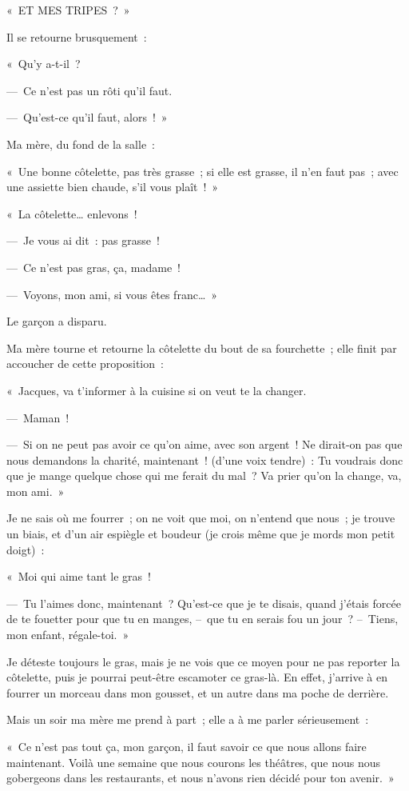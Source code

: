 \documentclass[french,twoside]{book} %
\begin{document}
« ET MES TRIPES ? »\par
Il se retourne brusquement :\par
« Qu’y a-t-il ?\par
— Ce n’est pas un rôti qu’il faut.\par
— Qu’est-ce qu’il faut, alors ! »\par
Ma mère, du fond de la salle :\par
« Une bonne côtelette, pas très grasse ; si elle est grasse, il n’en faut pas ; avec une assiette bien chaude, s’il vous plaît ! »\par
\bigbreak
\noindent « La côtelette… enlevons !\par
— Je vous ai dit : pas grasse !\par
— Ce n’est pas gras, ça, madame !\par
— Voyons, mon ami, si vous êtes franc… »\par
Le garçon a disparu.\par
Ma mère tourne et retourne la côtelette du bout de sa fourchette ; elle finit par accoucher de cette proposition :\par
« Jacques, va t’informer à la cuisine si on veut te la changer.\par
— Maman !\par
— Si on ne peut pas avoir ce qu’on aime, avec son argent ! Ne dirait-on pas que nous demandons la charité, maintenant ! (d’une voix tendre) : Tu voudrais donc que je mange quelque chose qui me ferait du mal ? Va prier qu’on la change, va, mon ami. »\par
Je ne sais où me fourrer ; on ne voit que moi, on n’entend que nous ; je trouve un biais, et d’un air espiègle et boudeur (je crois même que je mords mon petit doigt) :\par
« Moi qui aime tant le gras !\par
— Tu l’aimes donc, maintenant ? Qu’est-ce que je te disais, quand j’étais forcée de te fouetter pour que tu en manges, – que tu en serais fou un jour ? – Tiens, mon enfant, régale-toi. »\par
\bigbreak
\noindent Je déteste toujours le gras, mais je ne vois que ce moyen pour ne pas reporter la côtelette, puis je pourrai peut-être escamoter ce gras-là. En effet, j’arrive à en fourrer un morceau dans mon gousset, et un autre dans ma poche de derrière.\par
\bigbreak
\noindent Mais un soir ma mère me prend à part ; elle a à me parler sérieusement :\par
« Ce n’est pas tout ça, mon garçon, il faut savoir ce que nous allons faire maintenant. Voilà une semaine que nous courons les théâtres, que nous nous gobergeons dans les restaurants, et nous n’avons rien décidé pour ton avenir. »\par
\end{document}

